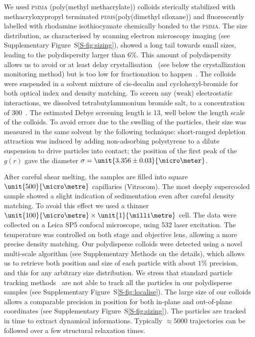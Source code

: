 We used \textsc{pmma} (poly(methyl methacrylate)) colloids sterically stabilized with methacryloxypropyl terminated \textsc{pdms}(poly(dimethyl siloxane)) and fluorescently labelled with rhodamine isothiocyanate chemically bonded to the \textsc{pmma}. The size distribution, as characterised by scanning electron microscopy imaging (see Supplementary Figure~S\ref{S-fig:sizing}), showed a long tail towards small sizes, leading to the polydispersity larger than 6\%. This amount of polydispersity allows us to avoid or at least delay crystallisation~\cite{Zaccarelli2009} (see below the crystallization monitoring method) but is too low for fractionation to happen~\citep{Fasolo2003}. The colloids were suspended in a solvent mixture of cis-decalin and cyclohexyl-bromide for both optical index and density matching. To screen any (weak) electrostatic interactions, we dissolved tetrabutylammonium bromide salt, to a concentration of \unit{300}{\nano\mole\per\liter}~\citep{royall2005}. The estimated Debye screening length is \unit{13}{\nano\metre}, well below the length scale of the colloids. To avoid errors due to the swelling of the particles, their size was measured in the same solvent by the following technique: short-ranged depletion attraction was induced by adding non-adsorbing polystyrene to a dilute suspension to drive particles into contact; the position of the first peak of the $g(r)$ gave the diameter $\sigma = \unit{3.356\pm0.03}{\micro\meter}$.

After careful shear melting, the samples are filled into square $\unit{500}{\micro\metre}$ capillaries (Vitrocom). The most deeply supercooled sample showed a slight indication of sedimentation even after careful density matching. To avoid this effect we used a thinner $\unit{100}{\micro\metre}\times\unit{1}{\milli\metre}$ cell. The data were collected on a Leica SP5 confocal microscope, using \unit{532}{\nano\meter} laser excitation. The temperature was controlled on both stage and objective lens, allowing a more precise density matching. Our polydisperse colloids were detected using a novel multi-scale algorithm (see Supplementary Methods on the details), which allows us to retrieve both position and size of each particle with about $1\%$ precision, and this for any arbitrary size distribution. We stress that standard particle tracking methods~\cite{kegel2000swe, weeks2000} are not able to track all the particles in our polydisperse samples (see Supplementary Figure~S\ref{S-fig:localise}). The large size of our colloids allows a comparable precision in position for both in-plane and out-of-plane coordinates (see Supplementary Figure~S\ref{S-fig:sizing}). The particles are tracked in time to extract dynamical informations. Typically $\approx 5000$ trajectories can be followed over a few structural relaxation times.

